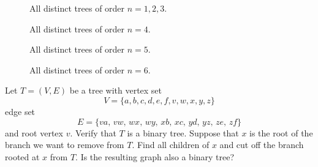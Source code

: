 \begin{figure}[!htbp]
\centering

\caption{All distinct trees of order $n = 1, 2, 3$.}
\label{fig:trees_forests:distinct_trees_specified_order_1_2_3}
\end{figure}

\begin{figure}[!htbp]
\centering

\caption{All distinct trees of order $n = 4$.}
\label{fig:trees_forests:distinct_trees_specified_order_4}
\end{figure}

\begin{figure}[!htbp]
\centering

\caption{All distinct trees of order $n = 5$.}
\label{fig:trees_forests:distinct_trees_specified_order_5}
\end{figure}

\begin{figure}[!htbp]
\centering

\caption{All distinct trees of order $n = 6$.}
\label{fig:trees_forests:distinct_trees_specified_order_6}
\end{figure}

\begin{example}
\label{eg:trees_forests:branch_cut_binary_tree}
Let $T = (V, E)$ be a tree with vertex set
\[
V
=
\{a, b, c, d, e, f, v, w, x, y, z\}
\]
edge set
\[
E
=
\{va,\, vw,\, wx,\, wy,\, xb,\, xc,\, yd,\, yz,\, ze,\, zf\}
\]
and root vertex $v$. Verify that $T$ is a binary tree. Suppose that
$x$ is the root of the branch we want to remove from $T$. Find all
children of $x$ and cut off the branch rooted at $x$ from $T$. Is the
resulting graph also a binary tree?
\end{example}

